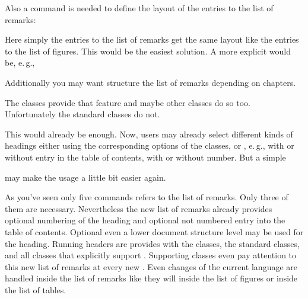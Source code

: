Also a command is needed to define the layout of the entries
to the list of remarks:
\begin{lstcode}[belowskip=\dp\strutbox plus 1pt]
  \newcommand*{\l@remarkbox}{\l@figure}
\end{lstcode}
Here simply the entries to the list of remarks get the same layout like the
entries to the list of figures. This would be the easiest solution. A more
explicit would be, e.\,g.,
\begin{lstcode}[belowskip=\dp\strutbox plus 1pt]
\end{lstcode}

Additionally you may want structure the list of
remarks depending on chapters.
\begin{lstcode}[belowskip=\dp\strutbox plus 1pt]
\end{lstcode}
The \KOMAScript{} classes provide that feature and maybe other classes do so
too. Unfortunately the standard classes do not.

This would already be enough. Now, users may already
select different kinds of headings either using the corresponding options of
the \KOMAScript{} classes, or , e.\,g., with or without entry
in the table of contents, with or without number. But a simple
\begin{lstcode}[belowskip=\dp\strutbox plus 1pt]
  \newcommand*{\listofremarkboxes}{\listoftoc{lor}}
\end{lstcode}
may make the usage a little bit easier again.

As you've seen only five commands refers to the list of remarks. Only three of
them are necessary. Nevertheless the new list of remarks already provides
optional numbering of the heading and optional not numbered entry into the
table of contents. Optional even a lower document structure level may be used
for the heading. Running headers are provides with the \KOMAScript{} classes,
the standard classes, and all classes that explicitly support
. Supporting classes even pay attention to this new list of
remarks at every new . Even changes of the current language are
handled inside the list of remarks like they will inside the list of figures
or inside the list of tables.

